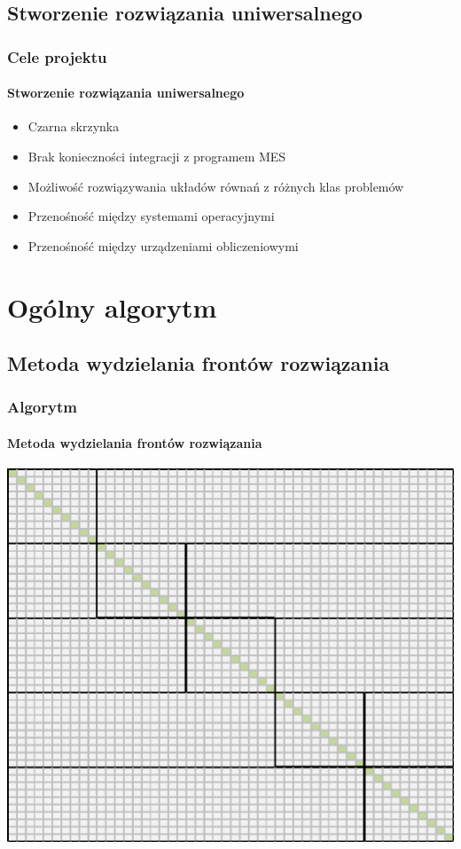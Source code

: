 \documentclass[12pt,handout]{beamer}
\begin{document}
\subsection{Stworzenie rozwiązania uniwersalnego}
  \begin{frame}
    \frametitle{Cele projektu}
    \framesubtitle{Stworzenie rozwiązania uniwersalnego}
	\begin{itemize}[<+->]
		\item Czarna skrzynka
		\item Brak konieczności integracji z programem MES
		\item Możliwość rozwiązywania układów równań z różnych klas problemów
		\item Przenośność między systemami operacyjnymi
		\item Przenośność między urządzeniami obliczeniowymi
	\end{itemize}
  \end{frame}

\section{Ogólny algorytm}

\subsection{Metoda wydzielania frontów rozwiązania}
\begin{frame}
\frametitle{Algorytm}
\framesubtitle{Metoda wydzielania frontów rozwiązania}
\hfill\includegraphics[scale=0.35]{fronty.png}\hspace*{\fill}
\end{frame}
\end{document}
